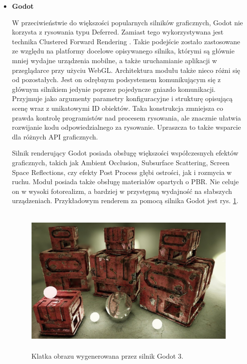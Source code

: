 \begin{itemize}
	\item \textbf{Godot}

	W przeciwieństwie do większości popularnych silników graficznych, Godot nie korzysta z rysowania typu Deferred. Zamiast tego wykorzystywana jest technika Clustered Forward Rendering \cite{godot:rendererdesign:2024}. Takie podejście zostało zastosowane ze względu na platformy docelowe opisywanego silnika, którymi są głównie mniej wydajne urządzenia mobilne, a także uruchamianie aplikacji w przeglądarce przy użyciu WebGL.
	Architektura modułu także nieco różni się od pozostałych. Jest on odrębnym podsystemem komunikującym się z głównym silnikiem jedynie poprzez pojedyncze gniazdo komunikacji. Przyjmuje jako argumenty parametry konfiguracyjne i strukturę opisującą scenę wraz z unikatowymi ID obiektów. Taka konstrukcja zmniejsza co prawda kontrolę programistów nad procesem rysowania, ale znacznie ułatwia rozwijanie kodu odpowiedzialnego za rysowanie. Upraszcza to także wsparcie dla różnych API graficznych.

	Silnik renderujący Godot posiada obsługę większości współczesnych efektów graficznych, takich jak Ambient Occlusion, Subsurface Scattering, Screen Space Reflections, czy efekty Post Process głębi ostrości, jak i rozmycia w ruchu. Moduł posiada także obsługę materiałów opartych o PBR. Nie celuje on w wysoki fotorealizm, a bardziej w przystępną wydajność na słabszych urządzeniach. Przykładowym renderem za pomocą silnika Godot jest rys. \ref{intro-godot}.

	\begin{figure}[htbp]
		\centering
		\includegraphics[width=4.90152in,height=2.92893in]{images/18_Godot_3_example.jpg}
		\caption{Klatka obrazu wygenerowana przez silnik Godot 3. \cite{godot:rendererdesign:2024}}
		\label{intro-godot}
	\end{figure}
\end{itemize}


